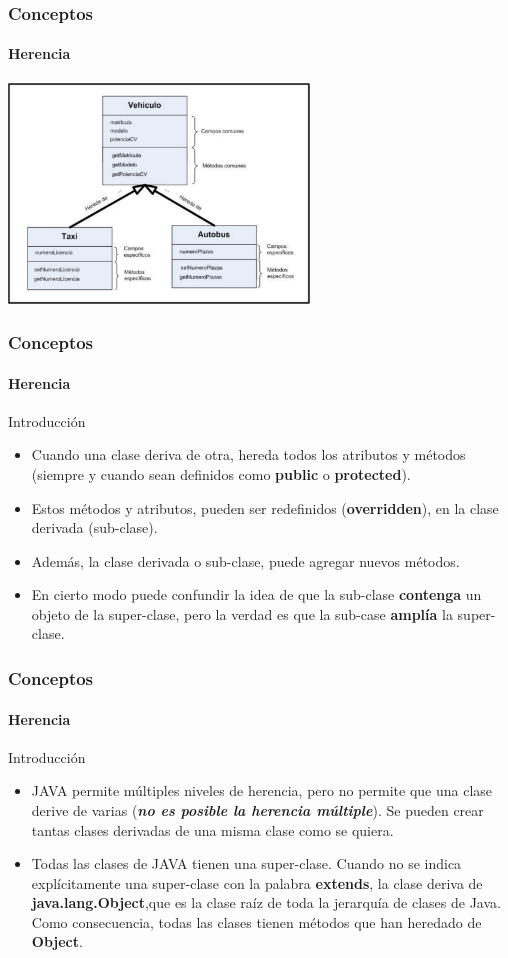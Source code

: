 \documentclass{beamer}
\begin{document}
		\begin{frame}
			\frametitle{Conceptos}
			\framesubtitle{Herencia}
		
			\begin{center}
				\includegraphics[width=8cm]{images/herencia_2.pdf}
			\end{center}
		\end{frame}

		\begin{frame}
			\frametitle{Conceptos}
			\framesubtitle{Herencia}

			\begin{block}{Introducci\'on}
				\begin{itemize}
  					\item Cuando una clase deriva de otra, hereda todos los atributos y m\'etodos (siempre y cuando sean definidos como \textbf{public} o \textbf{protected}).
					\item Estos m\'etodos y atributos, pueden ser redefinidos (\textbf{overridden}), en la clase derivada (sub-clase).
					\item Adem\'as, la clase derivada o sub-clase, puede agregar nuevos m\'etodos.
					\item En cierto modo puede confundir la idea de que la sub-clase \textbf{contenga} un objeto de la super-clase, pero la verdad es que la sub-case \textbf{ampl\'ia} la super-clase.
				\end{itemize}
			\end{block}
		\end{frame}

		\begin{frame}
			\frametitle{Conceptos}
			\framesubtitle{Herencia}

			\begin{block}{Introducci\'on}
				\begin{itemize}
  					\item JAVA permite m\'ultiples niveles de herencia, pero no permite que una clase derive de varias (\textbf{{\em no es posible la herencia m\'ultiple}}). Se pueden crear tantas clases derivadas de una misma clase como se quiera.
					\item Todas las clases de JAVA tienen una super-clase. Cuando no se indica expl\'icitamente una super-clase con la palabra  \textbf{extends}, la clase deriva de  \textbf{java.lang.Object},que es la clase ra\'iz de toda la jerarqu\'ia de clases de Java. Como consecuencia, todas las clases tienen m\'etodos que han heredado de \textbf{Object}.
				\end{itemize}
			\end{block}
		\end{frame}
\end{document}
